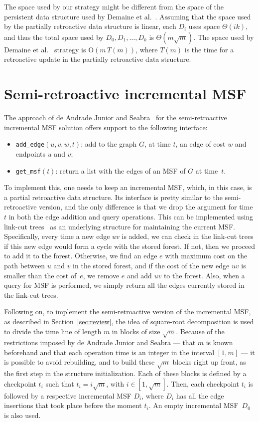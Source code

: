 \documentclass[3p,times,procedia]{elsarticle}
\newcommand{\Oh}{\mathrm{O}}
\begin{document}
\medskip 

The space used by our strategy might be different from the space of 
the persistent data structure used by Demaine et al.~\cite{DemaineIL2007}. 
Assuming that the space used by the partially retroactive 
data structure is linear, each $D_i$ uses space $\Theta(ik)$, 
and thus the total space used by $D_0,D_1,\ldots,D_k$ is $\Theta(m\sqrt{m})$. 
The space used by Demaine et al.~\cite{DemaineIL2007} strategy is $\Oh(m\,T(m))$, 
where $T(m)$ is the time for a retroactive update in the partially retroactive data structure. 

\section{Semi-retroactive incremental MSF}\label{sec:incMSF}

The approach of de Andrade Junior and Seabra~\cite{deAndradeJrS2022} for the 
semi-retroactive incremental MSF solution offers support to the following interface:
\begin{itemize}
\item \texttt{add\_edge}$(u,v,w,t)$: add to the graph $G$, at time $t$,
  an edge of cost $w$ and endpoints $u$ and $v$;
\item \texttt{get\_msf}$(t)$: return a list with the edges of an MSF of $G$ at
  time~$t$.
\end{itemize}

To implement this, one needs to keep an incremental MSF, which, in
this case, is a partial retroactive data structure. Its interface is
pretty similar to the semi-retroactive version, and the only difference
is that we drop the argument for time $t$ in both the edge addition and 
query operations. This can be implemented using link-cut trees~\cite{SleatorT1981} 
as an underlying structure for maintaining the current MSF. Specifically, 
every time a new edge $uv$ is added, we can check in the link-cut trees if 
this new edge would form a cycle with the stored forest. If not, then we 
proceed to add it to the forest.  
Otherwise, we find an edge $e$ with maximum cost on the path between $u$ 
and $v$ in the stored forest, and if the cost of the new edge $uv$ is smaller 
than the cost of~$e$, we remove $e$ and add $uv$ to the forest.
Also, when a query for MSF is performed, 
we simply return all the edges currently stored in the link-cut trees.

Following on, to implement the semi-retroactive version of the incremental MSF, 
as described in Section~\ref{sec:review}, the idea of square-root decomposition 
is used to divide the time line of length $m$ in blocks of size $\sqrt{m}$. 
Because of the restrictions imposed by de Andrade Junior and Seabra --- 
that $m$ is known beforehand and that each operation time is an integer in 
the interval $[1, m]$ --- it is possible to avoid rebuilding, and to build 
these $\sqrt{m}$ blocks right up front, as the first step in the structure 
initialization.  Each of these blocks is defined by a checkpoint $t_i$ such 
that $t_i = i \sqrt{m}$, with $i \in [1, \sqrt{m}]$. Then, each checkpoint 
$t_i$ is followed by a respective incremental MSF $D_i$, where $D_i$ has 
all the edge insertions that took place before the moment $t_i$.
An empty incremental MSF~$D_0$ is also used.
\end{document}
